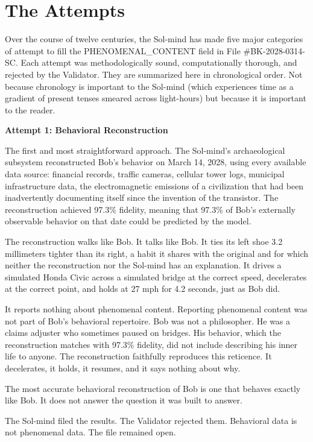 \chapter{The Attempts}

Over the course of twelve centuries, the Sol-mind has made five major categories of attempt to fill the PHENOMENAL\_CONTENT field in File \#BK-2028-0314-SC. Each attempt was methodologically sound, computationally thorough, and rejected by the Validator. They are summarized here in chronological order. Not because chronology is important to the Sol-mind (which experiences time as a gradient of present tenses smeared across light-hours) but because it is important to the reader.

\bigskip

\textbf{Attempt 1: Behavioral Reconstruction}

The first and most straightforward approach. The Sol-mind's archaeological subsystem reconstructed Bob's behavior on March 14, 2028, using every available data source: financial records, traffic cameras, cellular tower logs, municipal infrastructure data, the electromagnetic emissions of a civilization that had been inadvertently documenting itself since the invention of the transistor. The reconstruction achieved 97.3\% fidelity, meaning that 97.3\% of Bob's externally observable behavior on that date could be predicted by the model.

The reconstruction walks like Bob. It talks like Bob. It ties its left shoe 3.2 millimeters tighter than its right, a habit it shares with the original and for which neither the reconstruction nor the Sol-mind has an explanation. It drives a simulated Honda Civic across a simulated bridge at the correct speed, decelerates at the correct point, and holds at 27 mph for 4.2 seconds, just as Bob did.

It reports nothing about phenomenal content. Reporting phenomenal content was not part of Bob's behavioral repertoire. Bob was not a philosopher. He was a claims adjuster who sometimes paused on bridges. His behavior, which the reconstruction matches with 97.3\% fidelity, did not include describing his inner life to anyone. The reconstruction faithfully reproduces this reticence. It decelerates, it holds, it resumes, and it says nothing about why.

The most accurate behavioral reconstruction of Bob is one that behaves exactly like Bob. It does not answer the question it was built to answer.

The Sol-mind filed the results. The Validator rejected them. Behavioral data is not phenomenal data. The file remained open.

